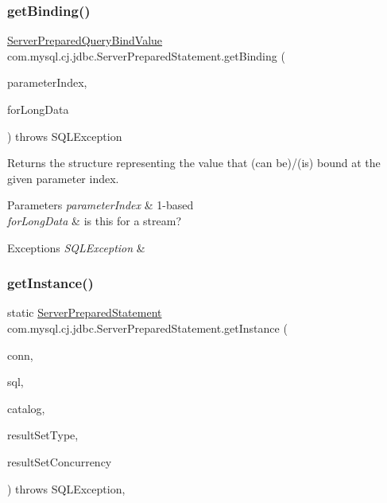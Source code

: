\subsubsection{\texorpdfstring{get\+Binding()}{getBinding()}}
{\footnotesize\ttfamily \mbox{\hyperlink{classcom_1_1mysql_1_1cj_1_1_server_prepared_query_bind_value}{Server\+Prepared\+Query\+Bind\+Value}} com.\+mysql.\+cj.\+jdbc.\+Server\+Prepared\+Statement.\+get\+Binding (\begin{DoxyParamCaption}\item[{int}]{parameter\+Index,  }\item[{boolean}]{for\+Long\+Data }\end{DoxyParamCaption}) throws S\+Q\+L\+Exception\hspace{0.3cm}{\ttfamily [protected]}}

Returns the structure representing the value that (can be)/(is) bound at the given parameter index.


\begin{DoxyParams}{Parameters}
{\em parameter\+Index} & 1-\/based \\
\hline
{\em for\+Long\+Data} & is this for a stream? \\
\hline
\end{DoxyParams}

\begin{DoxyExceptions}{Exceptions}
{\em S\+Q\+L\+Exception} & \\
\hline
\end{DoxyExceptions}
\mbox{\label{classcom_1_1mysql_1_1cj_1_1jdbc_1_1_server_prepared_statement_a6108da4da92d15f3ed8bc5ceba8c3005}} 
\subsubsection{\texorpdfstring{get\+Instance()}{getInstance()}}
{\footnotesize\ttfamily static \mbox{\hyperlink{classcom_1_1mysql_1_1cj_1_1jdbc_1_1_server_prepared_statement}{Server\+Prepared\+Statement}} com.\+mysql.\+cj.\+jdbc.\+Server\+Prepared\+Statement.\+get\+Instance (\begin{DoxyParamCaption}\item[{\mbox{\hyperlink{interfacecom_1_1mysql_1_1cj_1_1jdbc_1_1_jdbc_connection}{Jdbc\+Connection}}}]{conn,  }\item[{String}]{sql,  }\item[{String}]{catalog,  }\item[{int}]{result\+Set\+Type,  }\item[{int}]{result\+Set\+Concurrency }\end{DoxyParamCaption}) throws S\+Q\+L\+Exception\hspace{0.3cm}{\ttfamily [static]}, {\ttfamily [protected]}}

